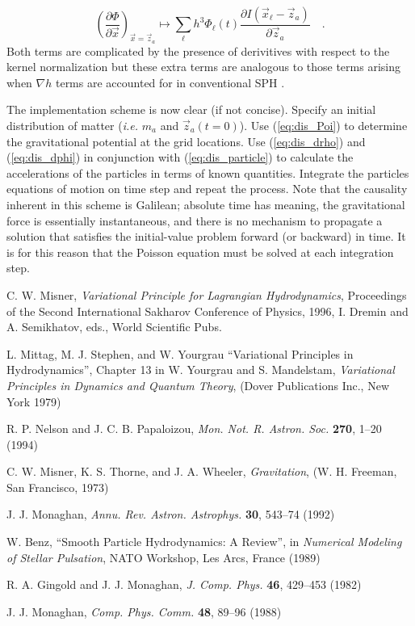 \documentclass{article}
\def\x{{\vec x}}
\def\z{{\vec z}}
\def\l{{\ell}}
\def\Pl{{\Phi_{\ell}}}
\def\.{{\quad .}}
\begin{document}
\begin{equation}\label{eq:gravForce}
    \left( \frac{\partial \Phi}{\partial \x} \right)_{\x = \z_a}
    \mapsto
    \sum_\l h^3  \Pl(t)
         \frac{\partial I({\x_\l} - {\z_a})}{\partial \z_a} \.
\end{equation}
Both terms are complicated by the presence of derivitives with respect to the
kernel normalization but these extra terms are analogous to those terms arising
when $\nabla h$ terms are accounted for in conventional SPH \cite{A:NP94}.

The implementation scheme is now clear (if not concise).  Specify an initial
distribution of matter ({\it i.e.} $m_a$ and $\z_a(t=0)$).  Use
(\ref{eq:dis_Poi}) to determine the gravitational potential at the grid
locations.  Use (\ref{eq:dis_drho}) and (\ref{eq:dis_dphi}) in conjunction with
(\ref{eq:dis_particle}) to calculate the accelerations of the particles in
terms of known quantities.  Integrate the particles equations of motion on time
step and repeat the process.  Note that the causality inherent in this scheme
is Galilean; absolute time has meaning, the gravitational force is essentially
instantaneous, and there is no mechanism to propagate a solution that satisfies
the initial-value problem forward (or backward) in time.  It is for this reason
that the Poisson equation must be solved at each integration step.

\begin{thebibliography}{9}

  C. W. Misner, \emph{Variational Principle for Lagrangian Hydrodynamics},
  Proceedings of the Second International Sakharov Conference of Physics, 1996,
  I. Dremin and A. Semikhatov, eds., World Scientific Pubs.

  L. Mittag, M. J. Stephen, and W. Yourgrau ``Variational Principles in Hydrodynamics'',
  Chapter 13 in W. Yourgrau and S. Mandelstam, \emph{Variational Principles in Dynamics
  and Quantum Theory}, (Dover Publications Inc., New York 1979)

  R. P. Nelson and J. C. B. Papaloizou, \emph{Mon. Not. R. Astron. Soc.}
  \textbf{270}, 1--20 (1994)

  C. W. Misner, K. S. Thorne, and J. A. Wheeler, \emph{Gravitation},
  (W. H. Freeman, San Francisco, 1973)

  J. J. Monaghan, \emph{Annu. Rev. Astron. Astrophys.} \textbf{30}, 543--74 (1992)

  W. Benz, ``Smooth Particle Hydrodynamics: A Review'', in \emph{Numerical Modeling of
  Stellar Pulsation}, NATO Workshop, Les Arcs, France (1989)

  R. A. Gingold and J. J. Monaghan, \emph{J. Comp. Phys.} \textbf{46}, 429--453 (1982)

  J. J. Monaghan, \emph{Comp. Phys. Comm.} \textbf{48}, 89--96 (1988)

\end{thebibliography}
\end{document}
